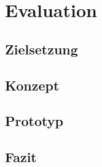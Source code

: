 \section{Evaluation}

\subsection{Zielsetzung}

\subsection{Konzept}

\subsection{Prototyp}

\subsection{Fazit}